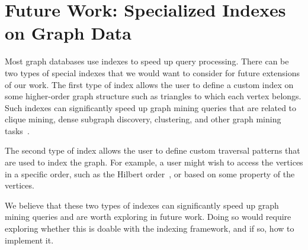 \chapter{Future Work: Specialized Indexes on Graph Data}
\label{chap:specialized_indexing}

Most graph databases use indexes to speed up query processing.
There can be two types of special indexes that we would want to consider for future extensions of our work.
The first type of index allows the user to define a custom index on some higher-order graph structure such as triangles to which each vertex belongs.
Such indexes can significantly speed up graph mining queries that are related to clique mining, dense subgraph discovery, clustering, and other graph mining tasks~\cite{sasaki2022language}.

The second type of index allows the user to define custom traversal patterns that are used to index the graph.
For example, a user might wish to access the vertices in a specific order, such as the Hilbert order~\cite{mcsherry2015scalability, trostanovsky2023vertex}, or based on some property of the vertices.

We believe that these two types of indexes can significantly speed up graph mining queries and are worth exploring in future work. Doing so would require exploring whether this is doable with the \wt{} indexing framework, and if so, how to implement it.